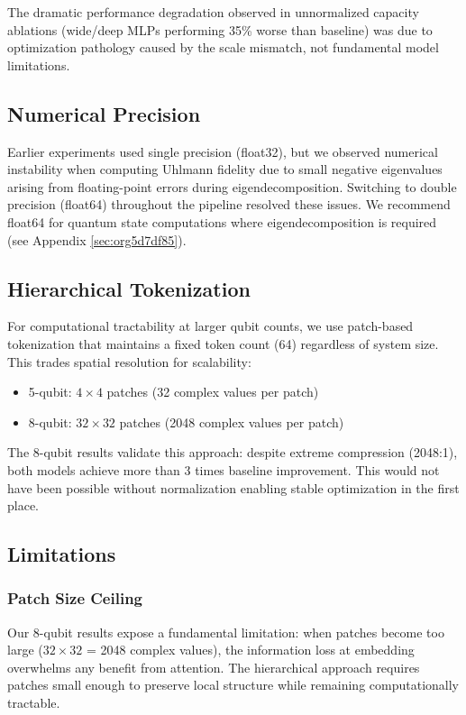 \documentclass[11pt]{article}
\begin{document}
The dramatic performance degradation observed in unnormalized capacity ablations (wide/deep MLPs performing 35\% worse than baseline) was due to optimization pathology caused by the scale mismatch, not fundamental model limitations.
\subsection{Numerical Precision}
\label{sec:org1637967}

Earlier experiments used single precision (float32), but we observed numerical instability when computing Uhlmann fidelity due to small negative eigenvalues arising from floating-point errors during eigendecomposition. Switching to double precision (float64) throughout the pipeline resolved these issues. We recommend float64 for quantum state computations where eigendecomposition is required (see Appendix \ref{sec:org5d7df85}).
\subsection{Hierarchical Tokenization}
\label{sec:org076048e}

For computational tractability at larger qubit counts, we use patch-based tokenization that maintains a fixed token count (64) regardless of system size. This trades spatial resolution for scalability:
\begin{itemize}
\item 5-qubit: \(4\times 4\) patches (32 complex values per patch)
\item 8-qubit: \(32\times 32\) patches (2048 complex values per patch)
\end{itemize}

The 8-qubit results validate this approach: despite extreme compression (2048:1), both models achieve more than 3 times baseline improvement. This would not have been possible without normalization enabling stable optimization in the first place.
\subsection{Limitations}
\label{sec:orgf6defc8}

\subsubsection{Patch Size Ceiling}
\label{sec:orga868da3}

Our 8-qubit results expose a fundamental limitation: when patches become too large (\(32\times 32\) = 2048 complex values), the information loss at embedding overwhelms any benefit from attention. The hierarchical approach requires patches small enough to preserve local structure while remaining computationally tractable.
\end{document}
